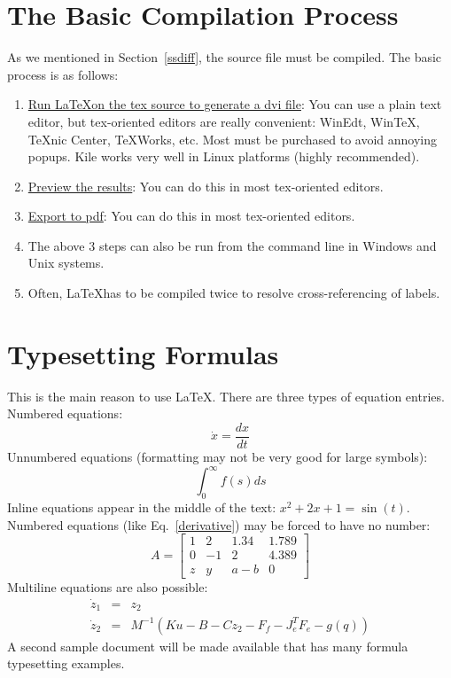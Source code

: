 \documentclass[10pt,twocolumn,letterpaper]{article} %
\begin{document}
\section{The Basic Compilation Process}
As we mentioned in Section~\ref{ssdiff}, the source file must be compiled. The basic process is as follows:
\begin{enumerate}
\item \underline{Run \LaTeX on the tex source to generate a dvi file}: You can use a plain text editor, but tex-oriented editors are really convenient: WinEdt, WinTeX, TeXnic Center, TeXWorks, etc. Most must be purchased to avoid annoying popups. Kile works very well in Linux platforms (highly recommended).
\item \underline{Preview the results}: You can do this in most tex-oriented editors.
\item \underline{Export to pdf}:  You can do this in most tex-oriented editors.
\item The above 3 steps can also be run from the command line in Windows and Unix systems.
\item Often, \LaTeX has to be compiled twice to resolve cross-referencing of labels.
\end{enumerate}
\section{Typesetting Formulas}
This is the main reason to use \LaTeX. There are three types of equation entries. Numbered equations:
\begin{equation}
\dot{x}=\frac{dx}{dt} \label{derivative}
\end{equation}
Unnumbered equations (formatting may not be very good for large symbols):
\[ \int_0^{\infty} f(s)ds \]
Inline equations appear in the middle of the text: $x^2+2x+1=\sin(t)$. Numbered equations (like Eq.~\ref{derivative}) may be forced to have no number:
\begin{equation}
A=\left [ %
\begin{array}{llrr} %
1 & 2 & 1.34 & 1.789 \\ %
0 & -1 & 2 & 4.389 \\
z & y & a-b & 0  %
\end{array} \right ] \nonumber
\end{equation}
Multiline equations are also possible:
\begin{eqnarray*} %
\dot{z}_1 &=& z_2 \label{stateq1} \\
\dot{z}_2 &=& M^{-1}(Ku-B-Cz_2-F_f-J_e^TF_e-g(q))
\end{eqnarray*}
A second sample document will be made available that has many formula typesetting examples.
\end{document}
